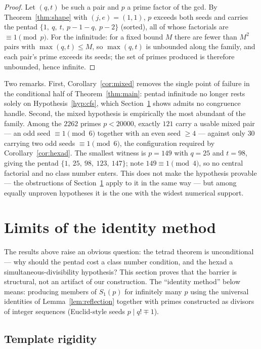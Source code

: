 \documentclass[11pt]{article}
\theoremstyle{definition}
\theoremstyle{remark}
\begin{document}
\begin{proof}
Let $(q, t)$ be such a pair and $p$ a prime factor of the gcd. By
Theorem~\ref{thm:shape} with $(j, e) = (1, 1)$, $p$ exceeds both seeds and
carries the pentad $\{1,\ q,\ t,\ p-1-q,\ p-2\}$ (sorted), all of whose
factorials are $\equiv 1 \pmod p$. For the infinitude: for a fixed bound $M$
there are fewer than $M^2$ pairs with $\max(q, t) \le M$, so $\max(q, t)$ is
unbounded along the family, and each pair's prime exceeds its seeds; the set
of primes produced is therefore unbounded, hence infinite.
\end{proof}

Two remarks. First, Corollary~\ref{cor:mixed} removes the single point of
failure in the conditional half of Theorem~\ref{thm:main}: pentad infinitude
no longer rests solely on Hypothesis~\ref{hyp:cfs}, which
Section~\ref{sec:limits} shows admits no congruence handle. Second, the
mixed hypothesis is empirically the most abundant of the family. Among the
$2262$ primes $p < 20000$, exactly $121$ carry a usable mixed pair --- an
odd seed $\equiv 1 \pmod 6$ together with an even seed $\ge 4$ --- against
only $30$ carrying two odd seeds $\equiv 1 \pmod 6$, the configuration
required by Corollary~\ref{cor:hexad}. The smallest witness is $p = 149$
with $q = 25$ and $t = 98$, giving the pentad
$\{1,\ 25,\ 98,\ 123,\ 147\}$; note $149 \equiv 1 \pmod 4$, so no central
factorial and no class number enters. This does not make the hypothesis
provable --- the obstructions of Section~\ref{sec:limits} apply to it in
the same way --- but among equally unproven hypotheses it is the one with
the widest numerical support.

\section{Limits of the identity method}\label{sec:limits}

The results above raise an obvious question: the tetrad theorem is
unconditional --- why should the pentad cost a class number condition, and
the hexad a simultaneous-divisibility hypothesis? This section proves that
the barrier is structural, not an artifact of our construction. The
``identity method'' below means: producing members of $S_1(p)$ for
infinitely many $p$ using the universal identities of
Lemma~\ref{lem:reflection} together with primes constructed as divisors of
integer sequences (Euclid-style seeds $p \mid q! \mp 1$).

\subsection{Template rigidity}
\end{document}
